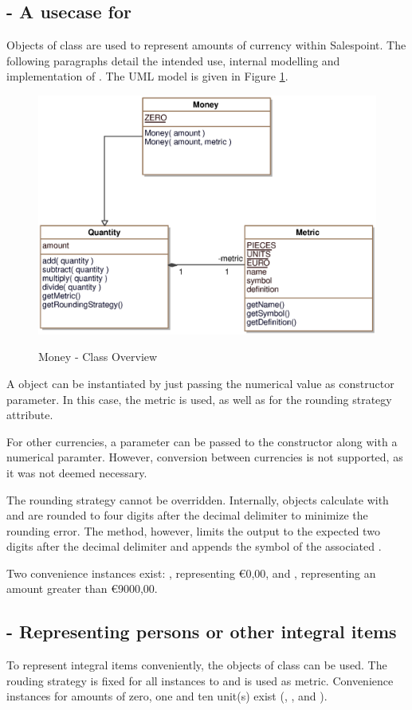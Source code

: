 \subsection{ - A usecase for }
Objects of class  are used to represent amounts of currency within Salespoint.
The following paragraphs detail the intended use, internal modelling and implementation of .
The UML model is given in Figure \ref{money_overview}.

\begin{figure}[ht]
	\centering
  \includegraphics[width=1.0\textwidth]{images/Money_Overview.eps}
	\label{money_overview}
	\caption{Money - Class Overview}
\end{figure}

A  object can be instantiated by just passing the numerical value as constructor parameter.
In this case, the metric  is used, as well as  for the rounding strategy attribute.

For other currencies, a  parameter can be passed to the constructor along with a numerical paramter.
However, conversion between currencies is not supported, as it was not deemed necessary.

The rounding strategy cannot be overridden.
Internally,  objects calculate with and are rounded to four digits after the decimal delimiter to minimize the rounding error.
The  method, however, limits the output to the expected two digits after the decimal delimiter and appends the symbol of the associated .

Two convenience instances exist: , representing \euro{0,00}, and , representing an amount greater than \euro{9000,00}.

\subsection{ - Representing persons or other integral items}
To represent integral items conveniently, the objects of class  can be used.
The rouding strategy is fixed for all instances to  and  is used as metric.
Convenience instances for amounts of zero, one and ten unit(s) exist (, , and ).

